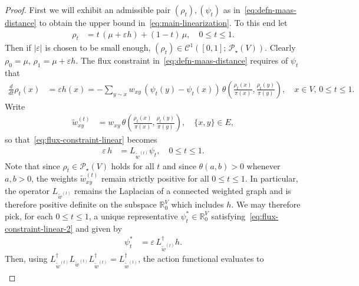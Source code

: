 \documentclass[11pt,a4paper]{article}
\newcommand{\Prob}{\mathscr{P}}
\begin{document}
\begin{proof}
    First we will exhibit an admissible pair $(\rho_t), (\psi_t)$ as in~\cref{eq:defn-maas-distance} to obtain the upper bound in~\cref{eq:main-linearization}. To this end let
        \begin{align*}
            \rho_t &= t\, (\mu + \varepsilon h) + (1-t) \, \mu,\quad 0\le t\le 1.
        \end{align*}
    Then if $|\varepsilon|$ is chosen to be small enough, $(\rho_t)\in \mathcal{C}^{1}([0, 1];\,\Prob_\star(V))$. Clearly $\rho_0 = \mu,\, \rho_1=\mu + \varepsilon h$. The flux constraint in~\cref{eq:defn-maas-distance} requires of $\psi_t$ that
        \begin{align}\label{eq:flux-constraint-linear}
            \frac{d}{dt} \rho_t(x) &= \varepsilon h(x) = -\sum_{y\sim x} w_{xy}\, (\psi_t(y) - \psi_t(x))\, \theta\left(\frac{\rho_t(x)}{\pi(x)}, \frac{\rho_t(y)}{\pi(y)}\right),\quad x\in V,\, 0\le t\le 1.
        \end{align} 
    Write
        \begin{align*}
            \widetilde{w}^{(t)}_{xy} &= w_{xy}\,\theta\left(\frac{\rho_t(x)}{\pi(x)}, \frac{\rho_t(y)}{\pi(y)}\right),\quad \{x, y\}\in E,
        \end{align*}
    so that~\cref{eq:flux-constraint-linear} becomes
        \begin{align}\label{eq:flux-constraint-linear-2}
            \varepsilon \, h &= L_{\widetilde{w}^{(t)}} \psi_t,\quad 0\le t\le 1.
        \end{align}
    Note that since $\rho_t\in\Prob_\star (V)$ holds for all $t$ and since $\theta(a, b) > 0$ whenever $a, b > 0$, the weights $\widetilde{w}^{(t)}_{xy}$ remain strictly positive for all $0\le t\le 1$. In particular, the operator $L_{\widetilde{w}^{(t)}}$ remains the Laplacian of a connected weighted graph and is therefore positive definite on the subspace $\mathbb{R}^{V}_0$ which includes $h$. We may therefore pick, for each $0\le t\le 1$, a unique representative $\psi_{t}^\ast\in\mathbb{R}^{V}_0$ satisfying~\cref{eq:flux-constraint-linear-2} and given by
        \begin{align*}
            \psi_t^\ast &= \varepsilon \, L_{\widetilde{w}^{(t)}}^{\dagger} h.
        \end{align*}
    Then, using $L_{\widetilde{w}^{(t)}}^{\dagger}L_{\widetilde{w}^{(t)}} L_{\widetilde{w}^{(t)}}^{\dagger} = L_{\widetilde{w}^{(t)}}^{\dagger}$, the action functional evaluates to
        \begin{align}\label{eq:action-upper-bound-1}

\end{align}
\end{proof}
\end{document}
